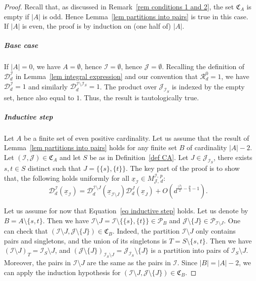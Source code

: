 \documentclass[10pt]{amsart}
\theoremstyle{definition}\newtheorem{defi}[theo]{Definition}\newtheorem{rema}[theo]{Remark}\newtheorem{exam}[theo]{Example}\newtheorem{exem}[theo]{Example}\newtheorem{nota}[theo]{Notation}
\newcommand{\D}{\mathcal{D}}
\newcommand{\I}{\mathcal{I}}
\newcommand{\J}{\mathcal{J}}
\newcommand{\clR}{\mathcal{R}}
\newcommand{\frkC}{\mathfrak{C}}
\newcommand{\pa}{\mathcal{P}\!}
\newcommand{\norm}[1]{\left\lvert #1 \right\rvert}
\begin{document}
\begin{proof}
Recall that, as discussed in Remark~\ref{rem conditions 1 and 2}, the set $\frkC_A$ is empty if $|A|$ is odd. Hence Lemma~\ref{lem partitions into pairs} is true in this case. If $|A|$ is even, the proof is by induction on (one half of) $|A|$.

\subparagraph*{Base case}
If $|A|=0$, we have $A = \emptyset$, hence $\I = \emptyset$, hence $\J = \emptyset$. Recalling the definition of $\D^\I_d$ in Lemma~\ref{lem integral expression} and our convention that $\clR_d^0=1$, we have $\D^\I_d =1$ and similarly $\D^{\I\setminus \I_S}_d =1$. The product over $\J_{\I_S}$ is indexed by the empty set, hence also equal to $1$. Thus, the result is tautologically true.

\subparagraph*{Inductive step}
Let $A$ be a finite set of even positive cardinality. Let us assume that the result of Lemma~\ref{lem partitions into pairs} holds for any finite set $B$ of cardinality $|A|-2$. Let $(\I,\J) \in \frkC_A$ and let $S$ be as in Definition~\ref{def CA}. Let $J \in \J_{\I_S}$, there exists $s,t \in S$ distinct such that $J =\{\{s\},\{t\}\}$. The key part of the proof is to show that, the following holds uniformly for all $\underline{x}_\I \in M^{\I,\,p}_{\J,\,d}$:
\begin{equation}\label{eq inductive step}
\D^\I_d\left(\underline{x}_\I\right) = \D_d^{\I \setminus J}\left(\underline{x}_{\I \setminus J}\right)\D_d^J\left(\underline{x}_J\right) +O\left(d^{\frac{\norm{\I}}{2}-\frac{p}{4}-1}\right).
\end{equation}

Let us assume for now that Equation~\eqref{eq inductive step} holds. Let us denote by $B = A \setminus \{s,t\}$. Then we have $\I \setminus J = \I \setminus \{\{s\},\{t\}\} \in \pa_B$ and $\J \setminus \{J\} \in \pa_{\I \setminus J}$. One can check that $(\I \setminus J, \J \setminus \{J\}) \in \frkC_B$. Indeed, the partition $\I \setminus J$ only contains pairs and singletons, and the union of its singletons is $T = S \setminus \{s,t\}$. Then we have $(\I \setminus J)_T = \I_S \setminus J$, and $(\J \setminus \{J\})_{\I_S \setminus J} = \J_{\I_S} \setminus \{J\}$ is a partition into pairs of $\I_S \setminus J$. Moreover, the pairs in $\I \setminus J$ are the same as the pairs in $\I$. Since $|B| = |A|-2$, we can apply the induction hypothesis for $(\I \setminus J, \J \setminus \{J\}) \in \frkC_B$.


\end{proof}
\end{document}
